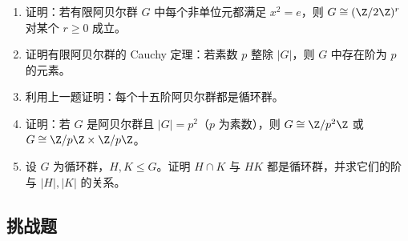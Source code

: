 \begin{enumerate}[start=31, label=\textbf{习题6.\arabic*.}, leftmargin=7em]
\[  \]
  \item \medium 证明：若有限阿贝尔群 $G$ 中每个非单位元都满足 $x^2=e$，则 $G\cong (\Z/2\Z)^r$ 对某个 $r\ge0$ 成立。
  \item \medium 证明有限阿贝尔群的 Cauchy 定理：若素数 $p$ 整除 $|G|$，则 $G$ 中存在阶为 $p$ 的元素。
  \item \medium 利用上一题证明：每个十五阶阿贝尔群都是循环群。
  \item \medium 证明：若 $G$ 是阿贝尔群且 $|G|=p^2$（$p$ 为素数），则 $G\cong \Z/p^2\Z$ 或 $G\cong \Z/p\Z \times \Z/p\Z$。
  \item \medium 设 $G$ 为循环群，$H,K\le G$。证明 $H\cap K$ 与 $HK$ 都是循环群，并求它们的阶与 $|H|,|K|$ 的关系。
\end{enumerate}

\subsection*{挑战题}

